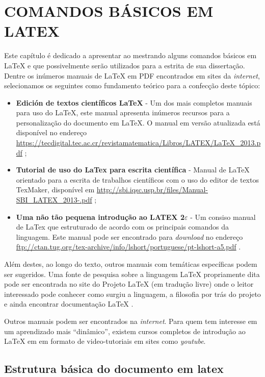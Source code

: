 
\chapter{COMANDOS BÁSICOS EM LATEX}

Este capítulo é dedicado a apresentar ao mestrando alguns comandos básicos em LaTeX e que possivelmente serão utilizados para a estrita de sua dissertação. Dentre os inúmeros manuais de LaTeX em PDF encontrados em sites da \textit{internet}, selecionamos os seguintes como fundamento teórico para a confecção deste tópico:
\begin{itemize}
	\item \textbf{Edición de textos científicos LaTeX} - Um dos mais completos manuais para uso do LaTeX, este manual apresenta inúmeros recursos para a personalização do documento em LaTeX. O manual em versão atualizada está disponível no endereço \url{https://tecdigital.tec.ac.cr/revistamatematica/Libros/LATEX/LaTeX_2013.pdf} \cite{latex-walter};
	\item \textbf{Tutorial de uso do LaTex para escrita científica} - Manual de LaTeX orientado para a escrita de trabalhos científicos com o uso do editor de textos TexMaker, disponível em \url{http://sbi.iqsc.usp.br/files/Manual-SBI_LATEX_2013-.pdf} \cite{latex-usp};
	\item \textbf{Uma não tão pequena
introdução ao LATEX 2$\varepsilon$} - Um consiso manual de LaTex que estruturado de acordo com os principais comandos da linguagem. Este manual pode ser encontrado para \textit{download} no endereço \url{ftp://ctan.tug.org/tex-archive/info/lshort/portuguese/pt-lshort-a5.pdf} \cite{oetiker}.
\end{itemize}

Além destes, ao longo do texto, outros manuais com temáticas específicas podem ser sugeridos. Uma fonte de pesquisa sobre a linguagem LaTeX propriamente dita pode ser encontrada no site do Projeto LaTeX (em tradução livre) onde o leitor interessado pode conhecer como surgiu a linguagem, a filosofia por trás do projeto e ainda encontrar documentação LaTeX \cite{LaTeX-Project}.

Outros manuais podem ser encontrados na \textit{internet}. Para quem tem interesse em um aprendizado mais ``dinâmico'', existem cursos completos de introdução ao LaTeX em em formato de video-tutoriais em sites como \textit{youtube}. 

\section{Estrutura básica do documento em latex}

